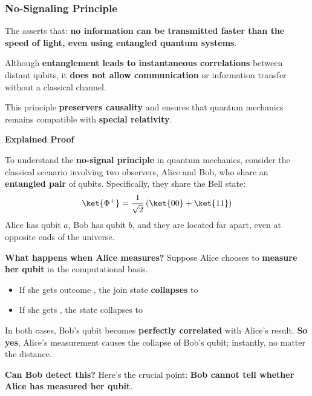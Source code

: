\subsubsection{No-Signaling Principle}\label{subsubsection: no-signaling principle}

The  asserts that: \textbf{no information can be transmitted faster than the speed of light, even using entangled quantum systems}.

\highspace
Although \textbf{entanglement leads to instantaneous correlations} between distant qubits, it \textbf{does not allow communication} or information transfer without a classical channel.

\highspace
This principle \textbf{preservers causality} and ensures that quantum mechanics remains compatible with \textbf{special relativity}.

\highspace
\begin{flushleft}
    \textcolor{Green3}{ \textbf{Explained Proof}}
\end{flushleft}
To understand the \textbf{no-signal principle} in quantum mechanics, consider the classical scenario involving two observers, Alice and Bob, who share an \textbf{entangled pair} of qubits. Specifically, they share the Bell state:
\begin{equation*}
    \ket{\Phi^{+}} = \dfrac{1}{\sqrt{2}}\left(\ket{00} + \ket{11}\right)
\end{equation*}
Alice has qubit $a$, Bob has qubit $b$, and they are located far apart, even at opposite ends of the universe.

\highspace
\textcolor{Green3}{\textbf{What happens when Alice measures?}} Suppose Alice chooses to \textbf{measure her qubit} in the computational basis.
\begin{itemize}
    \item If she gets outcome , the join state \textbf{collapses} to 
    \item If she gets , the state collapses to 
\end{itemize}
In both cases, Bob's qubit becomes \textbf{perfectly correlated} with Alice's result. \textbf{So yes}, Alice's measurement causes the collapse of Bob's qubit; instantly, no matter the distance.

\highspace
\textcolor{Green3}{\textbf{Can Bob detect this?}} Here's the crucial point: \textbf{Bob cannot tell whether Alice has measured her qubit}.

